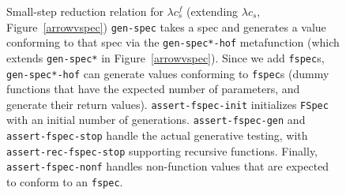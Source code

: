 \begin{figure}
  \caption{Small-step reduction relation for $\lambda c_{s}^{f}$ (extending $\lambda c_s$, Figure~\ref{arrowvspec})
  \texttt{gen-spec} takes a spec and generates a value conforming to that spec
  via the \texttt{gen-spec*-hof} metafunction (which extends \texttt{gen-spec*} in Figure~\ref{arrowvspec}).
	Since we add \texttt{fspec}s, \texttt{gen-spec*-hof} can generate values conforming to \texttt{fspec}s
(dummy functions that have the expected number of parameters, and generate their return values).
\texttt{assert-fspec-init} initializes \texttt{FSpec} with an initial number of generations.
\texttt{assert-fspec-gen}  and
\texttt{assert-fspec-stop} handle the actual generative testing, with 
\texttt{assert-rec-fspec-stop} supporting recursive functions.
Finally, \texttt{assert-fspec-nonf} handles non-function values that are expected to
conform to an \texttt{fspec}.
  }
  \label{arrowvspec-hof}
\end{figure}
